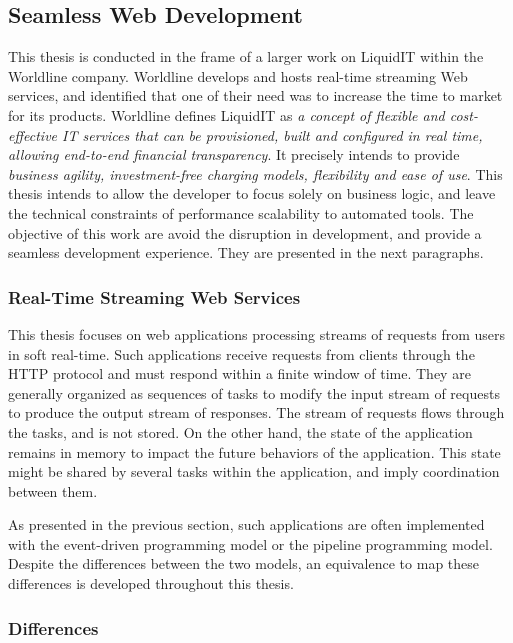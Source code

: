 \subsection{Seamless Web Development}

This thesis is conducted in the frame of a larger work on LiquidIT within the Worldline company.
Worldline develops and hosts real-time streaming Web services, and identified that one of their need was to increase the time to market for its products.
Worldline defines LiquidIT as \textit{a concept of flexible and cost-effective IT services that can be provisioned, built and configured in real time, allowing end-to-end financial transparency}.
It precisely intends to provide \textit{business agility, investment-free charging models, flexibility and ease of use}.
This thesis intends to allow the developer to focus solely on business logic, and leave the technical constraints of performance scalability to automated tools.
The objective of this work are avoid the disruption in development, and provide a seamless development experience.
They are presented in the next paragraphs.

\subsubsection{Real-Time Streaming Web Services}

This thesis focuses on web applications processing streams of requests from users in soft real-time.
Such applications receive requests from clients through the HTTP protocol and must respond within a finite window of time.
They are generally organized as sequences of tasks to modify the input stream of requests to produce the output stream of responses.
The stream of requests flows through the tasks, and is not stored.
On the other hand, the state of the application remains in memory to impact the future behaviors of the application.
This state might be shared by several tasks within the application, and imply coordination between them.

As presented in the previous section, such applications are often implemented with the event-driven programming model or the pipeline programming model.
Despite the differences between the two models, an equivalence to map these differences is developed throughout this thesis.

\subsubsection{Differences}

